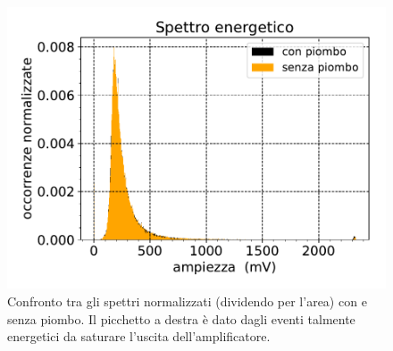 \begin{figure}[h]
\centering
\includegraphics[width=8 cm]{gemelli}
\caption{Confronto tra gli spettri normalizzati (dividendo per l'area) con e senza piombo. Il picchetto a destra è dato dagli eventi talmente energetici da saturare l'uscita dell'amplificatore.}
\label{gemini}    
\end{figure}

